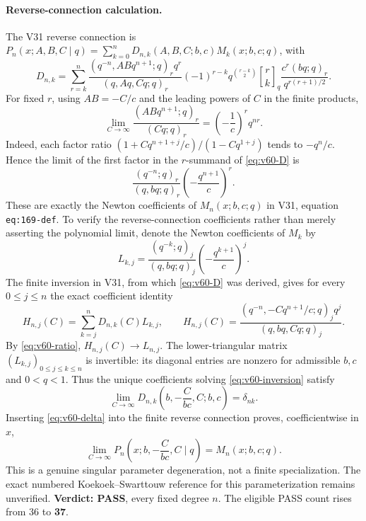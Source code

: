 \documentclass[11pt]{article}
\begin{document}
\paragraph{Reverse-connection calculation.}
The V31 reverse connection is $P_n(x;A,B,C\mid q)=\sum_{k=0}^n D_{n,k}(A,B,C;b,c)M_k(x;b,c;q)$, with
\begin{equation}\label{eq:v60-D}
 D_{n,k}=\sum_{r=k}^n
 \frac{(q^{-n},ABq^{n+1};q)_rq^r}{(q,Aq,Cq;q)_r}
 (-1)^{r-k}q^{\binom{r-k}{2}}{r\brack k}_q
 \frac{c^r(bq;q)_r}{q^{r(r+1)/2}}.
\end{equation}
For fixed $r$, using $AB=-C/c$ and the leading powers of $C$ in the finite products,
\begin{equation}\label{eq:v60-ratio}
 \lim_{C\to\infty}\frac{(ABq^{n+1};q)_r}{(Cq;q)_r}
 =\left(-\frac1c\right)^r q^{nr}.
\end{equation}
Indeed, each factor ratio $(1+Cq^{n+1+j}/c)/(1-Cq^{1+j})$ tends to $-q^n/c$. Hence the limit of the first factor in the $r$-summand of \eqref{eq:v60-D} is
\begin{equation}
 \frac{(q^{-n};q)_r}{(q,bq;q)_r}\left(-\frac{q^{n+1}}c\right)^r.
\end{equation}
These are exactly the Newton coefficients of $M_n(x;b,c;q)$ in V31, equation \texttt{eq:169-def}. To verify the reverse-connection coefficients rather than merely asserting the polynomial limit, denote the Newton coefficients of $M_k$ by
\begin{equation}
 L_{k,j}=\frac{(q^{-k};q)_j}{(q,bq;q)_j}\left(-\frac{q^{k+1}}c\right)^j.
\end{equation}
The finite inversion in V31, from which \eqref{eq:v60-D} was derived, gives for every $0\le j\le n$ the exact coefficient identity
\begin{equation}\label{eq:v60-inversion}
 H_{n,j}(C)=\sum_{k=j}^n D_{n,k}(C)L_{k,j},\qquad
 H_{n,j}(C)=\frac{(q^{-n},-Cq^{n+1}/c;q)_jq^j}{(q,bq,Cq;q)_j}.
\end{equation}
By \eqref{eq:v60-ratio}, $H_{n,j}(C)\to L_{n,j}$. The lower-triangular matrix $(L_{k,j})_{0\le j\le k\le n}$ is invertible: its diagonal entries are nonzero for admissible $b,c$ and $0<q<1$. Thus the unique coefficients solving \eqref{eq:v60-inversion} satisfy
\begin{equation}\label{eq:v60-delta}
 \boxed{\displaystyle\lim_{C\to\infty}D_{n,k}\left(b,-\frac{C}{bc},C;b,c\right)=\delta_{nk}.}
\end{equation}
Inserting \eqref{eq:v60-delta} into the finite reverse connection proves, coefficientwise in $x$,
\begin{equation}\label{eq:v60-limit}
 \boxed{\displaystyle\lim_{C\to\infty}P_n\left(x;b,-\frac{C}{bc},C\mid q\right)=M_n(x;b,c;q).}
\end{equation}
This is a genuine singular parameter degeneration, not a finite specialization. The exact numbered Koekoek--Swarttouw reference for this parameterization remains unverified. \textbf{Verdict: PASS}, every fixed degree $n$. The eligible PASS count rises from 36 to \textbf{37}.
\end{document}
